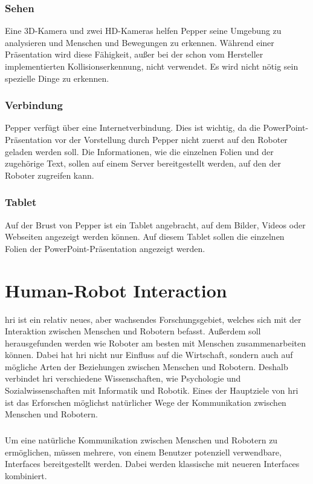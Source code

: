 \subsubsection{Sehen}\label{sec:sehen}
Eine 3D-Kamera und zwei HD-Kameras helfen Pepper seine Umgebung zu analysieren
und Menschen und Bewegungen zu erkennen. \cite{SoftBankII2018} Während einer
Präsentation wird diese Fähigkeit, außer bei der schon vom Hersteller implementierten
Kollisionserkennung, nicht verwendet. Es wird nicht nötig sein spezielle Dinge
zu erkennen.

\subsubsection{Verbindung}\label{sec:verbindung}
Pepper verfügt über eine Internetverbindung. \cite{SoftBankII2018} Dies ist
wichtig, da die PowerPoint-Präsentation vor der Vorstellung durch Pepper nicht zuerst auf den
Roboter geladen werden soll. Die Informationen, wie die einzelnen Folien und der
zugehörige Text, sollen auf einem Server bereitgestellt werden, auf den der
Roboter zugreifen kann.

\subsubsection{Tablet}\label{sec:tablet}
Auf der Brust von Pepper ist ein Tablet angebracht, auf dem Bilder, Videos oder
Webseiten angezeigt werden können. \cite{SoftBankII2018} Auf diesem Tablet
sollen die einzelnen Folien der PowerPoint-Präsentation angezeigt werden.

\section{Human-Robot Interaction}\label{sec:hri}
\ac{hri} ist ein relativ neues, aber wachsendes Forschungsgebiet, welches sich
mit der Interaktion zwischen Menschen und Robotern befasst. Außerdem soll
herausgefunden werden wie Roboter am besten mit Menschen zusammenarbeiten
können. Dabei hat \ac{hri} nicht nur Einfluss auf die Wirtschaft, sondern auch
auf mögliche Arten der Beziehungen zwischen Menschen und Robotern. Deshalb
verbindet \ac{hri} verschiedene Wissenschaften, wie Psychologie und
Sozialwissenschaften mit Informatik und Robotik. Eines der Hauptziele von
\ac{hri} ist das Erforschen möglichst natürlicher Wege der Kommunikation
zwischen Menschen und Robotern. \cite{Dautenhahn2011}

\subparagraph{}
Um eine natürliche Kommunikation zwischen Menschen und Robotern zu ermöglichen,
müssen mehrere, von einem Benutzer potenziell verwendbare, Interfaces
bereitgestellt werden. Dabei werden klassische mit neueren Interfaces
kombiniert.

